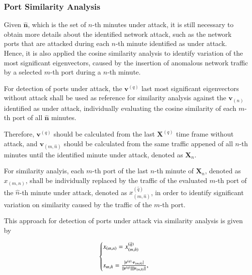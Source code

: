 \documentclass[review]{elsarticle}
\DeclarePairedDelimiter\abs{\lvert}{\rvert}%
\DeclarePairedDelimiter\norm{\lVert}{\rVert}%
\begin{document}
\subsubsection{Port Similarity Analysis}
\label{sec:prop_PortSimilarityAnalysis}

Given $\boldsymbol{\hat{n}}$, which is the set of $n$-th minutes under attack, it is still necessary to obtain more details about the identified network attack, such as the network ports that are attacked during each $n$-th minute identified as under attack. Hence, it is also applied the cosine similarity analysis to identify variation of the most significant eigenvectors, caused by the insertion of anomalous network traffic by a selected $m$-th port during a $n$-th minute. 

For detection of ports under attack, the $\boldsymbol{v}^{(q)}$ last most significant eigenvectors without attack shall be used as reference for similarity analysis against the $\boldsymbol{v}_{(n)}$ identified as under attack, individually evaluating the cosine similarity of each $m$-th port of all $\boldsymbol{\hat{n}}$ minutes.

Therefore, $\boldsymbol{v}^{(q)}$ should be calculated from the last $\boldsymbol{X}^{(q)}$ time frame without attack, and $\boldsymbol{v}_{(m,\hat{n})}$ should be calculated from the same traffic appened of all $n$-th minutes until the identified minute under attack, denoted as $\boldsymbol{X}_n$. 

For similarity analyis, each $m$-th port of the last $n$-th minute of $\boldsymbol{X}_n$, denoted as $x_{(m,n)}$, shall be individually replaced by the traffic of the evaluated $m$-th port of the $\hat{n}$-th minute under attack, denoted as $x^{(\hat{q})}_{(m,\hat{n})}$, in order to identify significant variation on similarity caused by the traffic of the $m$-th port. 

This approach for detection of ports under attack via similarity analysis is given by

\begin{equation}\label{eq:eq15}
  \left\{
  \begin{array}{@{}ll@{}}
    x_{(m,n)} = x^{(\hat{q})}_{(m,\hat{n})} \\
    \\
    s_{m,\hat{n}} = \frac{\abs{\boldsymbol{v}^{(q)} \cdot \boldsymbol{v}_{(m,\hat{n})}}}{\norm{\boldsymbol{v}^{(q)}}\norm{\boldsymbol{v}_{(m,\hat{n})}}},
  \end{array}\right.
\end{equation}
\end{document}
